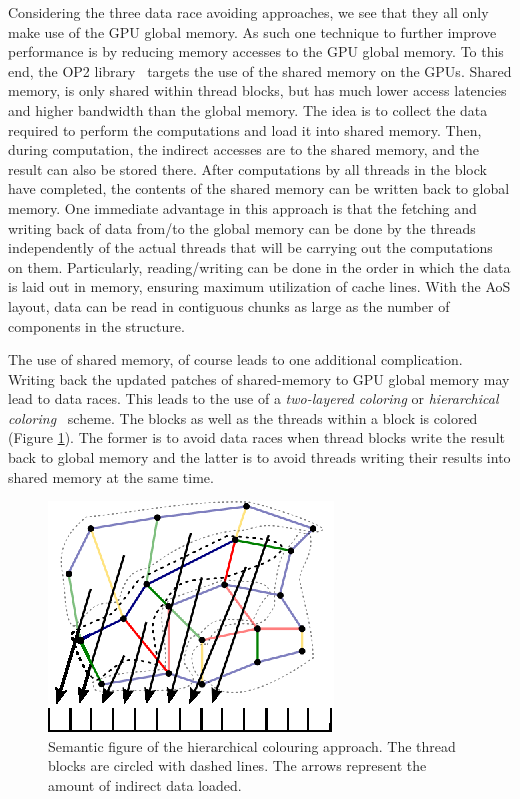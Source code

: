 Considering the three data race avoiding approaches, we see that they all only 
make use of the GPU global memory. As such one technique to further improve 
performance is by reducing memory accesses to the GPU global memory. To this 
end, the OP2 library~\cite{op2} targets the use of the shared memory on the 
GPUs. Shared memory, is only shared within thread blocks, but has much lower 
access latencies and higher bandwidth than the global memory. The idea is to 
collect the data required to perform the computations and load it into shared 
memory. Then, during computation, the indirect accesses are to the shared
memory, and the result can also be stored there. After computations by all 
threads in the block have completed, the contents of the shared memory can be 
written back to global memory. One immediate advantage in this approach is that 
the fetching and writing back of data from/to the global memory can be done by 
the threads independently of the actual threads that will be carrying out the 
computations on them. Particularly, reading/writing can be done in the order 
in which the data is laid out in memory, ensuring maximum utilization of 
cache lines. With the AoS layout, data can be read in contiguous chunks as 
large as the number of components in the structure.

The use of shared memory, of course leads to one additional complication. 
Writing back the updated patches of shared-memory to GPU global memory may lead 
to data races. This leads to the use of a \emph{two-layered coloring} or 
\emph{hierarchical coloring}~\cite{op2} scheme. The blocks as well as the 
threads within a block is colored (Figure \ref{fig:unstructured_hier}). The 
former is to avoid data races when thread blocks write the result back to 
global memory and the latter is to avoid threads writing their results into 
shared memory at the same time. 

\begin{figure}[Htpb]
  \centering
  \includegraphics{fig/svg/unstructured_hier.eps}
  \caption{Semantic figure of the hierarchical colouring approach. The thread
  blocks are circled with dashed lines. The arrows represent the amount of
  indirect data loaded.}
  \label{fig:unstructured_hier}
\end{figure}

